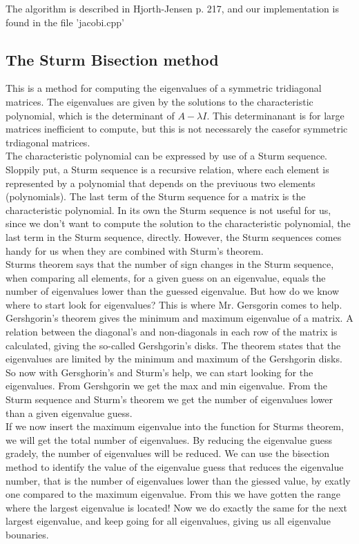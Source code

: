 \documentclass{article}
\begin{document}
The algorithm is described in Hjorth-Jensen \cite{MHJ} p. 217, and our implementation is found in the file 'jacobi.cpp'


\subsection{The Sturm Bisection method}
This is a method for computing the eigenvalues of a symmetric tridiagonal matrices. The eigenvalues are given by the solutions to the characteristic polynomial, which is the determinant of $A - \lambda I$. This determinanant is for large matrices inefficient to compute, but this is not necessarely the casefor symmetric trdiagonal matrices. \\

The characteristic polynomial can be expressed by use of a Sturm sequence. Sloppily put, a Sturm sequence is a recursive relation, where each element is represented by a polynomial that depends on the previuous two elements (polynomials). The last term of the Sturm sequence for a matrix is the characteristic polynomial. In its own the Sturm sequence is not useful for us, since we don't want to compute the solution to the characteristic polynomial, the last term in the Sturm sequence, directly. However, the Sturm sequences comes handy for us when they are combined with Sturm's theorem.\\

Sturms theorem says that the number of sign changes in the Sturm sequence, when comparing all elements, for a given guess on an eigenvalue, equals the number of eigenvalues lower than the guessed eigenvalue. But how do we know where to start look for eigenvalues? This is where Mr. Gersgorin comes to help.\\

Gershgorin's theorem gives the minimum and maximum eigenvalue of a matrix. A relation between the diagonal's and non-diagonals in each row of the matrix is calculated, giving the so-called Gershgorin's disks. The theorem states that the eigenvalues are limited by the minimum and maximum of the Gershgorin disks.\\

So now with Gersghorin's and Sturm's help, we can start looking for the eigenvalues. From Gershgorin we get the max and min eigenvalue. From the Sturm sequence and Sturm's theorem we get the number of eigenvalues lower than a given eigenvalue guess. \\

If we now insert the maximum eigenvalue into the function for Sturms theorem, we will get the total number of eigenvalues. By reducing the eigenvalue guess gradely, the number of eigenvalues will be reduced. We can use the bisection method to identify the value of the eigenvalue guess that reduces the eigenvalue number, that is the number of eigenvalues lower than the giessed value, by exatly one compared to the maximum eigenvalue. From this we have gotten the range where the largest eigenvalue is located! Now we do exactly the same for the next largest eigenvalue, and keep going for all eigenvalues, giving us all eigenvalue bounaries. \\
\end{document}
